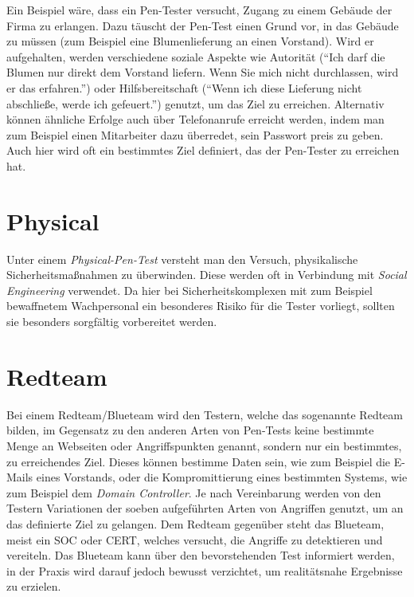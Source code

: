 Ein Beispiel wäre, dass ein Pen-Tester versucht, Zugang zu einem Gebäude der Firma zu erlangen. Dazu täuscht der Pen-Test einen Grund vor, in das Gebäude zu müssen (zum Beispiel eine Blumenlieferung an einen Vorstand). Wird er aufgehalten, werden verschiedene soziale Aspekte wie Autorität ("`Ich darf die Blumen nur direkt dem Vorstand liefern. Wenn Sie mich nicht durchlassen, wird er das erfahren."') oder Hilfsbereitschaft ("`Wenn ich diese Lieferung nicht abschließe, werde ich gefeuert."') genutzt, um das Ziel zu erreichen. Alternativ können ähnliche Erfolge auch über Telefonanrufe erreicht werden, indem man zum Beispiel einen Mitarbeiter dazu überredet, sein Passwort preis zu geben. Auch hier wird oft ein bestimmtes Ziel definiert, das der Pen-Tester zu erreichen hat.

	\newpage
	\section{Physical}
	Unter einem \textit{Physical-Pen-Test} versteht man den Versuch, physikalische Sicherheitsmaßnahmen zu überwinden. Diese werden oft in Verbindung mit \textit{Social Engineering} verwendet. Da hier bei Sicherheitskomplexen mit zum Beispiel bewaffnetem Wachpersonal ein besonderes Risiko für die Tester vorliegt, sollten sie besonders sorgfältig vorbereitet werden.

	\section{Redteam}
	Bei einem Redteam/Blueteam wird den Testern, welche das sogenannte Redteam bilden, im Gegensatz zu den anderen Arten von Pen-Tests keine bestimmte Menge an Webseiten oder Angriffspunkten genannt, sondern nur ein bestimmtes, zu erreichendes Ziel. Dieses können bestimme Daten sein, wie zum Beispiel die E-Mails eines Vorstands, oder die Kompromittierung eines bestimmten Systems, wie zum Beispiel dem \textit{Domain Controller}. Je nach Vereinbarung werden von den Testern Variationen der soeben aufgeführten Arten von Angriffen genutzt, um an das definierte Ziel zu gelangen. Dem Redteam gegenüber steht das Blueteam, meist ein SOC oder CERT, welches versucht, die Angriffe zu detektieren und vereiteln. Das Blueteam kann über den bevorstehenden Test informiert werden, in der Praxis wird darauf jedoch bewusst verzichtet, um realitätsnahe Ergebnisse zu erzielen.\\
	

	
	
	
	
	